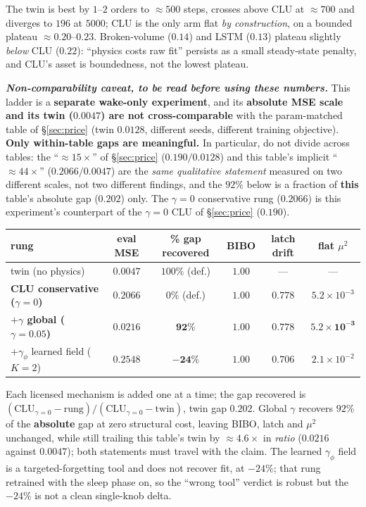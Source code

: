 \documentclass{article}
\begin{document}
The twin is best by $1$--$2$ orders to $\approx500$ steps, crosses above CLU at $\approx700$ and diverges to $196$ at $5000$; CLU is the only arm flat \emph{by construction}, on a bounded plateau $\approx0.20$--$0.23$. Broken-volume ($0.14$) and LSTM ($0.13$) plateau slightly \emph{below} CLU ($0.22$): ``physics costs raw fit'' persists as a small steady-state penalty, and CLU's asset is boundedness, not the lowest plateau.

\emph{\textbf{Non-comparability caveat, to be read before using these numbers.}} This ladder is a \textbf{separate wake-only experiment}, and its \textbf{absolute MSE scale and its twin ($0.0047$) are not cross-comparable} with the param-matched table of \S\ref{sec:price} (twin $0.0128$, different seeds, different training objective). \textbf{Only within-table gaps are meaningful.} In particular, do not divide across tables: the ``$\approx15\times$'' of \S\ref{sec:price} ($0.190/0.0128$) and this table's implicit ``$\approx44\times$'' ($0.2066/0.0047$) are the \emph{same qualitative statement} measured on two different scales, not two different findings, and the $92\%$ below is a fraction of \textbf{this} table's absolute gap ($0.202$) only. The $\gamma=0$ conservative rung ($0.2066$) is this experiment's counterpart of the $\gamma=0$ CLU of \S\ref{sec:price} ($0.190$).

\begin{center}\footnotesize
\begin{tabular}{lccccc}
\toprule
rung & eval MSE & \textbf{\% gap recovered} & BIBO & latch drift & flat $\mu^2$ \\
\midrule
twin (no physics) & $0.0047$ & $100\%$ (def.) & $1.00$ & --- & --- \\
\textbf{CLU conservative ($\gamma=0$)} & $0.2066$ & $0\%$ (def.) & $1.00$ & $0.778$ & $5.2{\times}10^{-3}$ \\
\textbf{$+\gamma$ global ($\gamma=0.05$)} & $0.0216$ & $\mathbf{92\%}$ & $\mathbf{1.00}$ & $\mathbf{0.778}$ & $\mathbf{5.2{\times}10^{-3}}$ \\
$+\gamma_\phi$ learned field ($K=2$) & $0.2548$ & $\mathbf{-24\%}$ & $1.00$ & $0.706$ & $2.1{\times}10^{-2}$ \\
\bottomrule
\end{tabular}
\end{center}

Each licensed mechanism is added one at a time; the gap recovered is $(\mathrm{CLU}_{\gamma=0}-\mathrm{rung})/(\mathrm{CLU}_{\gamma=0}-\mathrm{twin})$, twin gap $0.202$. Global $\gamma$ recovers $92\%$ of the \textbf{absolute} gap at zero structural cost, leaving BIBO, latch and $\mu^2$ unchanged, while still trailing this table's twin by $\approx4.6\times$ in \emph{ratio} ($0.0216$ against $0.0047$); both statements must travel with the claim. The learned $\gamma_\phi$ field is a targeted-forgetting tool and does not recover fit, at $-24\%$; that rung retrained with the sleep phase on, so the ``wrong tool'' verdict is robust but the $-24\%$ is not a clean single-knob delta.
\end{document}
